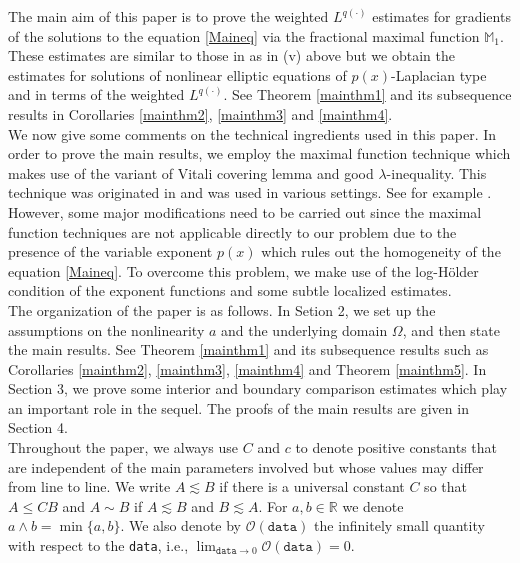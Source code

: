 \documentclass[a4paper,10pt]{amsart}
\newcommand{\lesi}{\lesssim}
\newcommand{\px}{p(x)}
\newcommand{\Om}{\Omega}
\begin{document}
The main aim of this paper is to prove the weighted $L^{q(\cdot)}$ estimates for  gradients of the solutions to the equation \eqref{Maineq} via the fractional maximal function $\mathbb{M}_1$. These estimates are similar to those in \cite{Ph} as in (v) above but we obtain the estimates for  solutions of nonlinear elliptic equations of $p(x)$-Laplacian type and in terms of the weighted $L^{q(\cdot)}$. See Theorem \ref{mainthm1} and its subsequence results in Corollaries \ref{mainthm2}, \ref{mainthm3} and \ref{mainthm4}.\\


We now give some comments on the technical ingredients used in this paper. 
In order to prove the main results, we employ the maximal function technique  which makes use of the variant of Vitali covering lemma 
and good $\lambda$-inequality. This technique was originated in \cite{CP} and was used in various settings. 
See for example \cite{BW, Ph,MP2,QHN, BDL}. However, some major modifications need to be carried out since 
the maximal function techniques are not applicable directly to our problem due to the presence of 
the variable exponent $\px$ which rules out the homogeneity of the equation \eqref{Maineq}. To overcome this problem, we  make use of the log-H\"older condition of the exponent functions and  some subtle localized estimates. \\


 The organization of the paper is as follows. In Setion 2, we set up the assumptions on the nonlinearity $a$ and the underlying domain $\Om$, and then state the main results. See Theorem \ref{mainthm1} and its subsequence results such as  Corollaries \ref{mainthm2}, \ref{mainthm3}, \ref{mainthm4} and Theorem \ref{mainthm5}. In Section 3, we prove some interior and boundary comparison estimates which play an important role in the sequel. The proofs of the main results are given in Section 4.\\
 
 
 Throughout the paper, we always use $C$ and $c$ to denote positive constants that are independent of the main parameters involved but whose values may differ from line to line. We write
 $A\lesi B$ if there is a universal constant $C$ so that $A\leq CB$ and $A\sim B$ if $A\lesi B$ and $B\lesi A$. For $a, b\in \mathbb{R}$ we denote $a\wedge b =\min\{a,b\}$. We also denote  by  $\mathcal{O}(\texttt{data})$ the infinitely small quantity with respect to the \texttt{data}, i.e., $\lim_{\texttt{data}\to 0}\mathcal{O}(\texttt{data})=0$.
\end{document}
